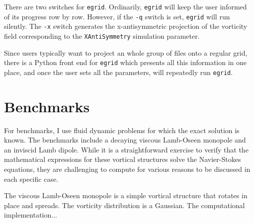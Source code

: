 \documentclass[12pt]{report}
\begin{document}
There are two switches for {\tt egrid}.  Ordinarily, {\tt egrid}
will keep the user informed of its progress row by row.  However, if the
{\tt -q} switch is set, {\tt egrid} will run silently.  The {\tt -x}
switch generates the x-antisymmetric projection of the vorticity field
corresponding to the {\tt XAntiSymmetry} simulation parameter.

Since users typically want to project an whole group of files onto a regular
grid, there is a Python front end for {\tt egrid} which
presents all this information in one place, and once the user sets all the
parameters, will repeatedly run {\tt egrid}.

% 

\section{Benchmarks}

For benchmarks, I use fluid dynamic problems for which the exact solution is
known.  The benchmarks include a decaying viscous Lamb-Oseen monopole and an
inviscid Lamb dipole.  While it is a straightforward exercise to verify that the
mathematical expressions for these vortical structures solve
the Navier-Stokes equations, they are challenging to compute for various
reasons to be discussed in each specific case.

The viscous Lamb-Oseen monopole is a simple vortical structure that rotates in
place and spreads.  The vorticity distribution is a Gaussian.  The
computational implementation...
\end{document}
